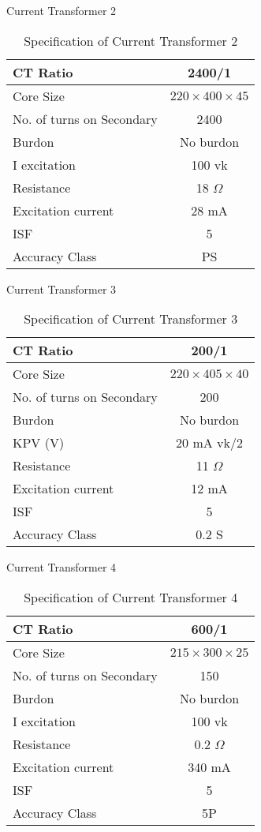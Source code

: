 \clearpage
Current Transformer 2
\begin{table}[h!]
\caption{Specification of Current Transformer 2}
\label{table:Specification of Current Transformer 2}
\centering
\begin{tabular}{|l|c|}
\hline 
CT Ratio &  2400/1  \\ \hline 
Core Size & $220 \times 400 \times 45$ \\ \hline 
No. of turns on Secondary  & 2400 \\ \hline 
Burdon & No burdon  \\ \hline 
I excitation   & 100 vk \\ \hline 
Resistance  & 18 $\Omega$ \\ \hline 
Excitation current & 28 mA \\ \hline 
ISF  & 5 \\ \hline 
Accuracy Class  & PS \\ \hline 
\end{tabular} 
\end{table}

Current Transformer 3
\begin{table}[h!]
\caption{Specification of Current Transformer 3}
\label{table:Specification of Current Transformer 3}
\centering
\begin{tabular}{|l|c|}
\hline 
CT Ratio &  200/1  \\ \hline 
Core Size & $220 \times 405 \times 40$ \\ \hline 
No. of turns on Secondary  & 200 \\ \hline 
Burdon & No burdon  \\ \hline 
KPV (V)   & 20 mA vk/2 \\ \hline 
Resistance  & 11 $\Omega$\\ \hline 
Excitation current & 12 mA \\ \hline 
ISF  & 5 \\ \hline 
Accuracy Class  & 0.2 S \\ \hline 
\end{tabular} 
\end{table}

\clearpage
Current Transformer 4
\begin{table}[th!]
\caption{Specification of Current Transformer 4}
\label{table:Specification of Current Transformer 4}
\centering
\begin{tabular}{|l|c|}
\hline 
CT Ratio &  600/1  \\ \hline 
Core Size & $215 \times 300 \times 25$ \\ \hline 
No. of turns on Secondary  & 150 \\ \hline 
Burdon & No burdon  \\ \hline 
I excitation   & 100 vk \\ \hline 
Resistance  & 0.2 $\Omega$ \\ \hline 
Excitation current & 340 mA \\ \hline 
ISF  & 5 \\ \hline 
Accuracy Class  & 5P \\ \hline 
\end{tabular} 
\end{table}

